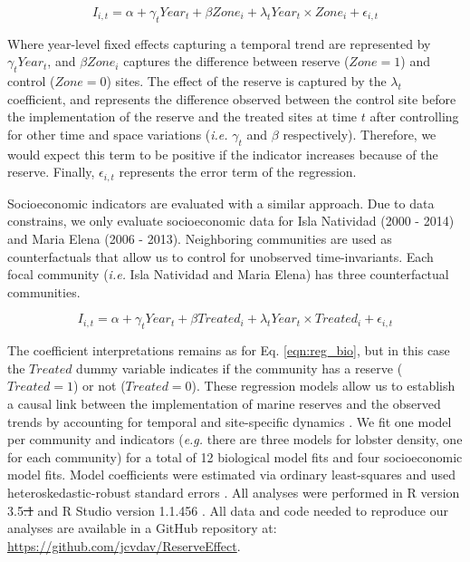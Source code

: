 \documentclass{frontiersSCNS}
\providecommand{\DIFaddtex}[1]{{\protect\color{blue}\uwave{#1}}} %
\providecommand{\DIFdeltex}[1]{{\protect\color{red}\sout{#1}}}                      %
\providecommand{\DIFaddbegin}{} %
\providecommand{\DIFaddend}{} %
\providecommand{\DIFdelbegin}{} %
\providecommand{\DIFdelend}{} %
\providecommand{\DIFadd}[1]{\texorpdfstring{\DIFaddtex{#1}}{#1}} %
\providecommand{\DIFdel}[1]{\texorpdfstring{\DIFdeltex{#1}}{}} %
\begin{document}
\begin{equation}
I_{i,t} = \alpha + \gamma_{t} Year_t + \beta Zone_i + \lambda_{t} Year_t\times Zone_i + \epsilon_{i,t}
\label{eqn:reg_bio}
\end{equation}

Where year-level fixed effects capturing a temporal trend are
represented by \(\gamma_t Year_t\), and \(\beta Zone_i\) captures the
difference between reserve (\(Zone = 1\)) and control (\(Zone = 0\))
sites. The effect of the reserve is captured by the \(\lambda_t\)
coefficient, and represents the difference observed between the control
site before the implementation of the reserve and the treated sites at
time \(t\) after controlling for other time and space variations
(\emph{i.e.} \(\gamma_t\) and \(\beta\) respectively). Therefore, we
would expect this term to be positive if the indicator increases because
of the reserve. Finally, \(\epsilon_{i,t}\) represents the error term of
the regression.

Socioeconomic indicators are evaluated with a similar approach. Due to
data constrains, we only evaluate socioeconomic data for Isla Natividad
(2000 - 2014) and Maria Elena (2006 - 2013). Neighboring communities are
used as counterfactuals that allow us to control for unobserved
time-invariants. Each focal community (\emph{i.e.} Isla Natividad and
Maria Elena) has three counterfactual communities.

\begin{equation}
I_{i,t} = \alpha + \gamma_{t} Year_t + \beta Treated_i + \lambda_{t} Year_t\times Treated_i +\epsilon_{i,t}
\label{eqn:soc_reg}
\end{equation}

The coefficient interpretations remains as for Eq. \ref{eqn:reg_bio},
but in this case the \(Treated\) dummy variable indicates if the
community has a reserve (\(Treated = 1\)) or not (\(Treated = 0\)).
These regression models allow us to establish a causal link between the
implementation of marine reserves and the observed trends by accounting
for temporal and site-specific dynamics \citep{depalma_2018}. We fit one
model per community and indicators (\emph{e.g.} there are three models
for lobster density, one for each community) for a total of 12
biological model fits and four socioeconomic model fits. Model
coefficients were estimated via ordinary least-squares and used
heteroskedastic-robust standard errors \citep{zeileis_2004-7n}. All
analyses were performed in R version 3.5\DIFdelbegin \DIFdel{.1 }\DIFdelend \DIFaddbegin \DIFadd{.2 }\DIFaddend and R Studio version 1.1.456
\citep{R_2018}. All data and code needed to reproduce our analyses are
available in a GitHub repository at:
\url{https://github.com/jcvdav/ReserveEffect}.
\end{document}
